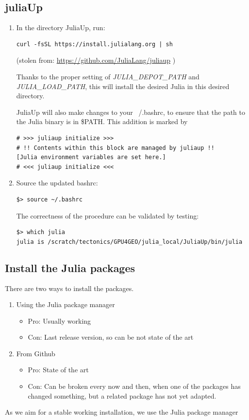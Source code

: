 \documentclass{article}
\begin{document}
\subsection{juliaUp}

\begin{enumerate} 

\item In the directory JuliaUp, run:
\begin{verbatim}
curl -fsSL https://install.julialang.org | sh
\end{verbatim}
(stolen from: \url{https://github.com/JuliaLang/juliaup} )

Thanks to the proper setting of \textit{JULIA\_DEPOT\_PATH} and \textit{JULIA\_LOAD\_PATH},
this will install the desired Julia in this desired directory.

JuliaUp will also make changes to your ~/.bashrc, to ensure that the path to the
Julia binary is in \$PATH. This addition is marked by

\begin{verbatim}
# >>> juliaup initialize >>>
# !! Contents within this block are managed by juliaup !!
[Julia environment variables are set here.]
# <<< juliaup initialize <<<
\end{verbatim}

\item Source the updated bashrc:

\begin{verbatim}
$> source ~/.bashrc
\end{verbatim}

The correctness of the procedure can be validated by testing:

\begin{verbatim}
$> which julia
julia is /scratch/tectonics/GPU4GEO/julia_local/JuliaUp/bin/julia
\end{verbatim}

\end{enumerate} 


\subsection{Install the Julia packages}
There are two ways to install the packages.
\begin{enumerate}
\item Using the Julia package manager
\begin{itemize}
\item Pro: Usually working
\item Con: Last release version, so can be not state of the art
\end{itemize}
\item From Github
\begin{itemize}
\item Pro: State of the art
\item Con: Can be broken every now and then, when one of the packages has changed something,
but a related package has not yet adapted. 
\end{itemize}
\end{enumerate}
As we aim for a stable working installation, we use the Julia package manager
\end{document}
